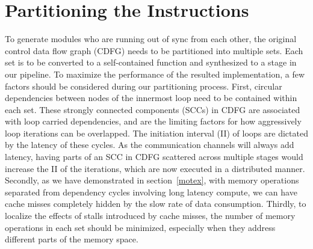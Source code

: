 \section{Partitioning the Instructions}
\label{sec:partins}
To generate modules who are running out of sync from each other, the original
control data flow graph (CDFG) needs to be partitioned into multiple sets.
Each set is to be converted to a self-contained function and synthesized to
a stage in our pipeline.
To maximize the performance of the resulted implementation, a few factors
should be considered during our partitioning process. 
First, circular dependencies between
nodes of the innermost loop need to be contained within each set. These strongly
connected components (SCCs) in CDFG are associated with
loop carried dependencies, and are the limiting factors for how
aggressively loop iterations can be overlapped. The initiation
interval (II) of loops are dictated by the latency of these cycles.
As the communication channels will always add latency,
having parts of an SCC in CDFG scattered across multiple
stages would increase the II of the iterations, which are now
executed in a distributed manner. 
Secondly, as we have demonstrated in section~\ref{motex}, with memory operations separated
from dependency cycles involving long latency compute, we
can have cache misses completely hidden by the slow rate
of data consumption.
Thirdly, to
localize the effects of stalls introduced by cache misses, the
number of memory operations in each set should be
minimized, especially when they address different parts of the
memory space.



 


